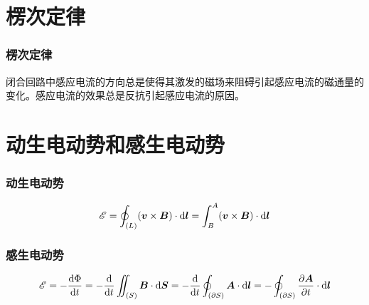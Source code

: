 \documentclass[UTF8,AutoFakeBold,b5paper]{ctexbook}
\begin{document}
\section{楞次定律}
\subsubsection{楞次定律}
闭合回路中感应电流的方向总是使得其激发的磁场来阻碍引起感应电流的磁通量的变化。\textcolor[rgb]{0.56,0.28,0.16}{感应电流的效果总是反抗引起感应电流的原因。}
\section{动生电动势和感生电动势}
\subsubsection{动生电动势}
\begin{equation}
	\mathscr{E} = \oint_{(L)} (\bm{v} \times \bm{B}) \cdot \ce{d}\bm{l} = \int_{B}^{A} (\bm{v} \times \bm{B}) \cdot \ce{d}\bm{l}
\end{equation}
\subsubsection{感生电动势}
\begin{equation}
	\mathscr{E} = -\dfrac{\ce{d}\Phi}{\ce{d}t} = -\dfrac{\ce{d}}{\ce{d}t}\iint_{(S)}\bm{B}\cdot \ce{d}\bm{S} = -\dfrac{\ce{d}}{\ce{d}t}\oint_{(\partial S)}\bm{A}\cdot \ce{d}\bm{l}=-\oint_{(\partial S)}\dfrac{\partial\bm{A}}{\partial t} \cdot \ce{d}\bm{l}
\end{equation}
\printindex
\end{document}
